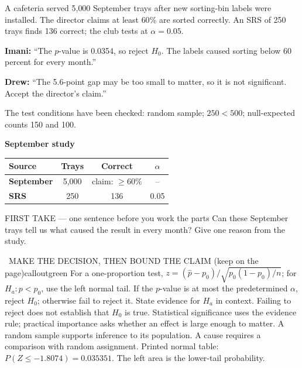 \documentclass[11pt]{article}
\begin{document}


A cafeteria served 5{,}000 September trays after new sorting-bin labels were installed. The director claims at least $60\%$ are sorted correctly. An SRS of 250 trays finds 136 correct; the club tests at $\alpha=0.05$.\par\smallskip \textbf{Imani:} ``The $p$-value is 0.0354, so reject $H_0$. The labels caused sorting below 60 percent for every month.''\par \textbf{Drew:} ``The 5.6-point gap may be too small to matter, so it is not significant. Accept the director's claim.''\par\smallskip The test conditions have been checked: random sample; $250<500$; null-expected counts 150 and 100.\par
\begin{center}
\textbf{September study}\par\smallskip
\begin{tabular}{|l|c|c|c|}
\hline
\textbf{Source} & \textbf{Trays} & \textbf{Correct} & \textbf{$\alpha$} \\ \hline
\textbf{September} & 5,000 & claim: $\geq 60\%$ & -- \\ \hline
\textbf{SRS} & 250 & 136 & 0.05 \\ \hline
\end{tabular}
\end{center}
\begin{firsttakebox}{FIRST TAKE --- one sentence before you work the parts}
Can these September trays tell us what caused the result in every month? Give one reason from the study.
\workspace{0.9in}
\end{firsttakebox}

\begin{callout}{\IconBook\ MAKE THE DECISION, THEN BOUND THE CLAIM (keep on the page)}{calloutgreen}
For a one-proportion test, $z=(\widehat p-p_0)/\sqrt{p_0(1-p_0)/n}$; for $H_a:p<p_0$, use the left normal tail.
If the $p$-value is at most the predetermined $\alpha$, reject $H_0$; otherwise fail to reject it.
State evidence for $H_a$ in context. Failing to reject does not establish that $H_0$ is true.
Statistical significance uses the evidence rule; practical importance asks whether an effect is large enough to matter.
A random sample supports inference to its population. A cause requires a comparison with random assignment.
Printed normal table: $P(Z\leq-1.8074)=0.035351$. The left area is the lower-tail probability.
\end{callout}
\end{document}
